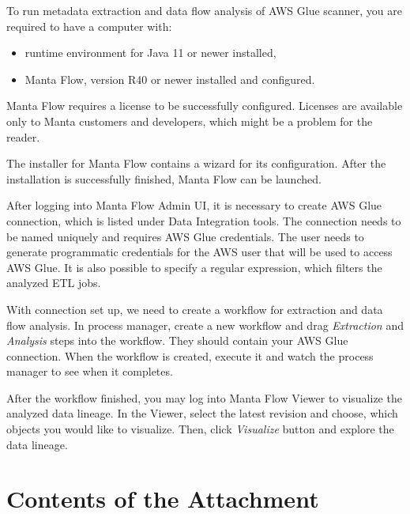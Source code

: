 \documentclass[12pt,a4paper]{report}
\begin{document}
To run metadata extraction and data flow analysis of AWS Glue scanner, you are required to have a computer with:
\begin{itemize}
    \item runtime environment for Java 11 or newer installed,
    \item Manta Flow, version R40 or newer installed and configured.
\end{itemize}
Manta Flow requires a license to be successfully configured. Licenses are available only to Manta customers and developers, which might be a problem for the reader.
\par
The installer for Manta Flow contains a wizard for its configuration. After the installation is successfully finished, Manta Flow can be launched.
\par
After logging into Manta Flow Admin UI, it is necessary to create AWS Glue connection, which is listed under Data Integration tools. The connection needs to be named uniquely and requires AWS Glue credentials. The user needs to generate programmatic credentials for the AWS user that will be used to access AWS Glue. It is also possible to specify a regular expression, which filters the analyzed ETL jobs.
\par
With connection set up, we need to create a workflow for extraction and  data flow analysis. In process manager, create a new workflow and drag \textit{Extraction} and \textit{Analysis} steps into the workflow. They should contain your AWS Glue connection. When the workflow is created, execute it and watch the process manager to see when it completes.
\par
After the workflow finished, you may log into Manta Flow Viewer to visualize the analyzed data lineage. In the Viewer, select the latest revision and choose, which objects you would like to visualize. Then, click \textit{Visualize} button and explore the data lineage.

\section{Contents of the Attachment}
\end{document}
